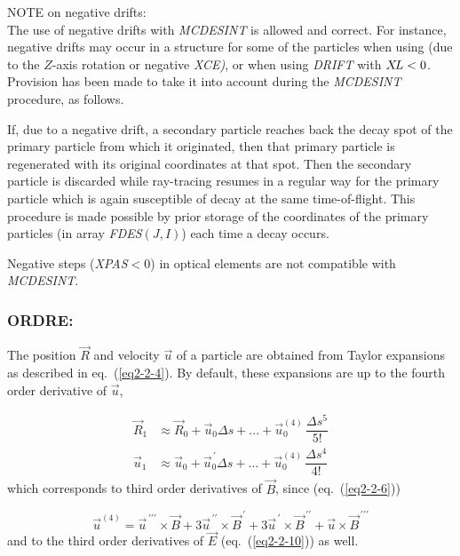 \noindent  NOTE on negative drifts: \\
The use  of  negative  drifts  with  \textsl{MCDESINT}  is  allowed 
and correct. 
For instance,  negative drifts  may  occur  in  a  structure   for 
some  of  the  particles  when  using  \CHANGREF{} (due to  the  $ Z$-axis 
rotation  or  negative  \textsl{XCE)},  or  when  using  \textsl{DRIFT}  with 
$X\!L<0$. 
Provision  has  been  made  to  take  it  into  account during  the \textsl{MCDESINT}
 procedure,  as follows. 

\noindent If, due   to  a  negative  drift,   a  secondary  particle  reaches 
back the  decay spot of the  primary  particle  from which it originated, then 
that  primary  particle  is  regenerated  with its original coordinates 
at  that  spot. Then   the   secondary   particle   is   discarded   while 
ray-tracing  resumes  in  a  regular way  for the primary  particle which  
is again susceptible of decay  at  the  same  time-of-flight. This  procedure  is made 
possible  by  prior storage  of  the  coordinates of the primary 
particles (in array \textsl{FDES}$(J,I)$) each  time  a  decay  occurs. 

\noindent Negative steps (\textsl{XPAS}$<0$) in
optical elements are not compatible with  \textsl{MCDESINT}.  
 \newpage

\subsubsection*{ORDRE: \ORDRETitl } \label{ORDRE} 
\medskip

 The position $ \vec  R $ and velocity $ \vec  u $ of a particle are
obtained from Taylor expansions as described in eq.~(\ref{eq2-2-4}). By default, these 
expansions are up to the fourth order derivative of $ \vec  u$, 

\begin{align*}
	\vec  R_1 
	     & \approx  \vec  R_0 + \vec  u_0 \Delta s +...+ \vec u^{(4)}_0 \, \dfrac{\Delta s^5 }{ 5!} \\
	\vec  u_1 
	     & \approx  \vec  u_0 + \vec  u^{\,\prime}_0 \Delta s  
	        + \ldots + \vec  u^{(4)}_0\, \dfrac{\Delta s^4 }{ 4!}   
\end{align*}
%
 which corresponds to third order derivatives of $ \vec  B $, since (eq.~(\ref{eq2-2-6}))
 
 $$ 
 \vec  u^{(4)} = \vec  u^{\,\prime\prime\prime}  \times  \vec  B 
 + 3\vec u^{\,\prime\prime}  \times  \vec  B^{\,\prime}  
 + 3\vec  u^{\,\prime}  \times \vec  B^{\,\prime\prime}  
 + \vec  u  \times   \vec  B^{\,\prime\prime\prime}
$$
%
 and to the third order derivatives of $ \vec  E $ (eq.~(\ref{eq2-2-10})) as well.

